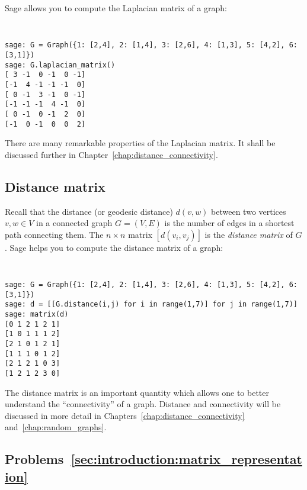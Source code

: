 Sage allows you to compute the Laplacian matrix of a graph:
%
\begin{center}
\fontsize{9pt}{9pt}
\selectfont
\tt
\begin{lstlisting}
sage: G = Graph({1: [2,4], 2: [1,4], 3: [2,6], 4: [1,3], 5: [4,2], 6: [3,1]})
sage: G.laplacian_matrix()
[ 3 -1  0 -1  0 -1]
[-1  4 -1 -1 -1  0]
[ 0 -1  3 -1  0 -1]
[-1 -1 -1  4 -1  0]
[ 0 -1  0 -1  2  0]
[-1  0 -1  0  0  2]
\end{lstlisting}
\end{center}
%
There are many remarkable properties of the Laplacian matrix. It shall
be discussed further in Chapter~\ref{chap:distance_connectivity}.



\subsection{Distance matrix}

Recall that the distance (or geodesic distance) $d(v,w)$ between two
vertices $v,w \in V$ in a connected graph $G = (V,E)$ is the number of
edges in a shortest path connecting them. The $n \times n$ matrix
$[d(v_i, v_j)]$ is the \emph{distance matrix} of $G$. Sage helps you
to compute the distance matrix of a graph:
%
\begin{center}
\fontsize{9pt}{9pt}
\selectfont
\tt
\begin{lstlisting}
sage: G = Graph({1: [2,4], 2: [1,4], 3: [2,6], 4: [1,3], 5: [4,2], 6: [3,1]})
sage: d = [[G.distance(i,j) for i in range(1,7)] for j in range(1,7)]
sage: matrix(d)
[0 1 2 1 2 1]
[1 0 1 1 1 2]
[2 1 0 1 2 1]
[1 1 1 0 1 2]
[2 1 2 1 0 3]
[1 2 1 2 3 0]
\end{lstlisting}
\end{center}

The distance matrix is an important quantity which allows one to
better understand the ``connectivity'' of a graph. Distance and
connectivity will be discussed in more detail in
Chapters~\ref{chap:distance_connectivity}
and~\ref{chap:random_graphs}.



\subsection*{Problems~\ref{sec:introduction:matrix_representation}}

